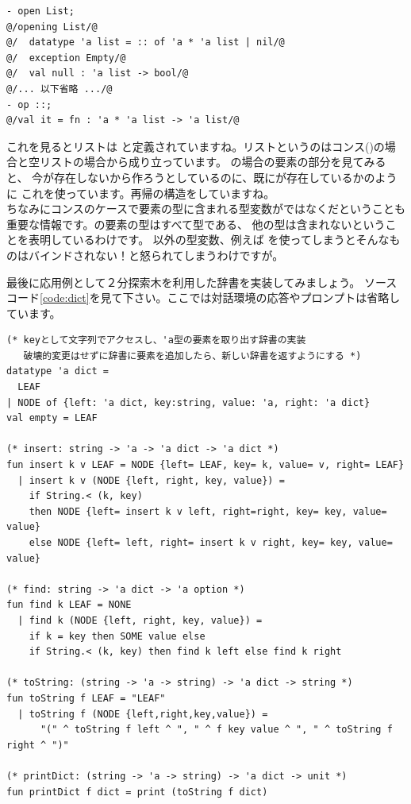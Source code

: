 \documentclass[11pt,a4paper]{jarticle}
\begin{document}
\begin{lstlisting}[caption=リストの定義を確認する,label=code:open-list]
- open List;
@/opening List/@
@/  datatype 'a list = :: of 'a * 'a list | nil/@
@/  exception Empty/@
@/  val null : 'a list -> bool/@
@/... 以下省略 .../@
- op ::;
@/val it = fn : 'a * 'a list -> 'a list/@
\end{lstlisting}

これを見るとリストは
と定義されていますね。リストというのはコンス(\prog{::})の場合と空リストの場合から成り立っています。
\prog{::}の場合の要素の部分を見てみると、
今が存在しないから作ろうとしているのに、既にが存在しているかのように
これを使っています。再帰の構造をしていますね。\\
ちなみにコンスのケースで要素の型に含まれる型変数がではなくだということも
重要な情報です。の要素の型はすべて型である、
他の型は含まれないということを表明しているわけです。
以外の型変数、例えば
を使ってしまうとそんなものはバインドされない！と怒られてしまうわけですが。


最後に応用例として２分探索木を利用した辞書を実装してみましょう。
ソースコード\ref{code:dict}を見て下さい。ここでは対話環境の応答やプロンプトは省略しています。

\begin{lstlisting}[caption=２分探索木による辞書の実装,label=code:dict]
(* keyとして文字列でアクセスし、'a型の要素を取り出す辞書の実装
   破壊的変更はせずに辞書に要素を追加したら、新しい辞書を返すようにする *)
datatype 'a dict =
  LEAF
| NODE of {left: 'a dict, key:string, value: 'a, right: 'a dict}
val empty = LEAF

(* insert: string -> 'a -> 'a dict -> 'a dict *)
fun insert k v LEAF = NODE {left= LEAF, key= k, value= v, right= LEAF}
  | insert k v (NODE {left, right, key, value}) =
    if String.< (k, key)
    then NODE {left= insert k v left, right=right, key= key, value= value}
    else NODE {left= left, right= insert k v right, key= key, value= value}

(* find: string -> 'a dict -> 'a option *)
fun find k LEAF = NONE
  | find k (NODE {left, right, key, value}) =
    if k = key then SOME value else
    if String.< (k, key) then find k left else find k right

(* toString: (string -> 'a -> string) -> 'a dict -> string *)
fun toString f LEAF = "LEAF"
  | toString f (NODE {left,right,key,value}) =
      "(" ^ toString f left ^ ", " ^ f key value ^ ", " ^ toString f right ^ ")"

(* printDict: (string -> 'a -> string) -> 'a dict -> unit *)
fun printDict f dict = print (toString f dict)
\end{lstlisting}
\end{document}
